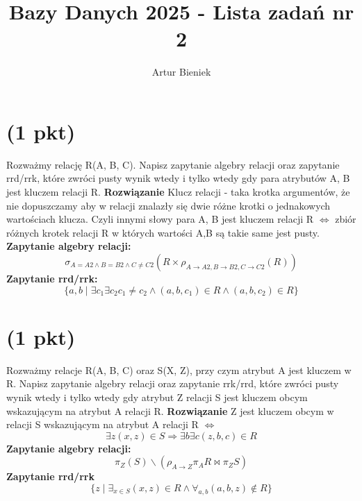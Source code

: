 \documentclass{article}
\begin{document}
\title{Bazy Danych 2025 - Lista zadań nr 2}
\author{Artur Bieniek}

\maketitle

\section{(1 pkt)}
Rozważmy relację R(A, B, C).
Napisz zapytanie algebry relacji oraz zapytanie rrd/rrk, które zwróci pusty wynik wtedy i tylko wtedy gdy para atrybutów
A, B jest kluczem relacji R.
\newline\textbf{Rozwiązanie}\newline
Klucz relacji - taka krotka argumentów, że nie dopuszczamy aby w relacji znalazły się dwie różne krotki o jednakowych wartościach klucza. Czyli innymi słowy para A, B jest kluczem relacji R $\Leftrightarrow$ zbiór różnych krotek relacji R w których wartości A,B są takie same jest pusty.
\newline\textbf{Zapytanie algebry relacji:}
\[
        \sigma_{A=A2 \wedge B=B2 \wedge C\not=C2}
        (R \times \rho_{A \rightarrow A2, B \rightarrow B2, C \rightarrow C2}(R))
\]
\textbf{Zapytanie rrd/rrk:}
\[
        \{a, b \mid \exists c_1 \exists c_2 c_1\not=c_2 \wedge (a, b, c_1)\in R \wedge (a, b, c_2)\in R\}
\]

\section{(1 pkt)}
Rozważmy relacje R(A, B, C) oraz S(X, Z), przy czym atrybut A jest kluczem w R. Napisz zapytanie algebry relacji oraz zapytanie rrk/rrd, które zwróci
pusty wynik wtedy i tylko wtedy gdy atrybut Z relacji S jest kluczem obcym
wskazującym na atrybut A relacji R.
\newline\textbf{Rozwiązanie}\newline
Z jest kluczem obcym w relacji S wskazującym na atrybut A relacji R $\Leftrightarrow$ \[
\exists z (x, z)\in S \Rightarrow
\exists b\exists c (z, b, c) \in R
\]
\textbf{Zapytanie algebry relacji:}
\[
        \pi_{Z}(S)\backslash(\rho_{A\rightarrow Z}\pi_{A}R \bowtie \pi_{Z}S)
\]
\textbf{Zapytanie rrd/rrk}
\[
        \{z \mid \exists_{x\in S} (x, z)\in R \wedge \forall_{a, b} (a, b, z)\not\in R\}
\]
\end{document}
